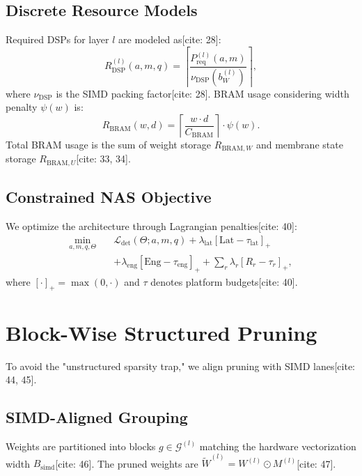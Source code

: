 \documentclass[10pt,journal,compsoc]{IEEEtran}
\begin{document}
\subsection{Discrete Resource Models}
Required DSPs for layer $l$ are modeled as[cite: 28]:
\begin{equation}
R_{\text{DSP}}^{(l)}(a,m,q) = \left\lceil \frac{P^{(l)}_{\text{req}}(a,m)}{\nu_{\text{DSP}}(b_W^{(l)})} \right\rceil,
\end{equation}
where $\nu_{\text{DSP}}$ is the SIMD packing factor[cite: 28]. BRAM usage considering width penalty $\psi(w)$ is:
\begin{equation}
R_{\text{BRAM}}(w,d) = \left\lceil \frac{w \cdot d}{C_{\text{BRAM}}} \right\rceil \cdot \psi(w).
\end{equation}
Total BRAM usage is the sum of weight storage $R_{\text{BRAM},W}$ and membrane state storage $R_{\text{BRAM},U}$[cite: 33, 34].

\subsection{Constrained NAS Objective}
We optimize the architecture through Lagrangian penalties[cite: 40]:
\begin{equation}
\begin{aligned}
\min_{a,m,q,\Theta} \quad & \mathcal{L}_{\text{det}}(\Theta; a,m,q) + \lambda_{\text{lat}}[\text{Lat} - \tau_{\text{lat}}]_{+} \\
& + \lambda_{\text{eng}}[\text{Eng} - \tau_{\text{eng}}]_{+} + \sum_{r} \lambda_r[R_r - \tau_r]_{+},
\end{aligned}
\end{equation}
where $[\cdot]_{+} = \max(0, \cdot)$ and $\tau$ denotes platform budgets[cite: 40].

\section{Block-Wise Structured Pruning}
To avoid the "unstructured sparsity trap," we align pruning with SIMD lanes[cite: 44, 45].

\subsection{SIMD-Aligned Grouping}
Weights are partitioned into blocks $g \in \mathcal{G}^{(l)}$ matching the hardware vectorization width $B_{\text{simd}}$[cite: 46]. The pruned weights are $\widetilde{W}^{(l)} = W^{(l)} \odot M^{(l)}$[cite: 47].
\end{document}
